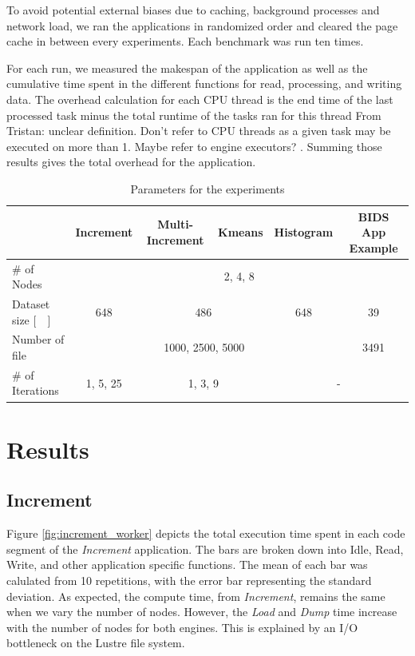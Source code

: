 \documentclass[conference]{IEEEtran}
\newcommand{\TG}[1]{\color{cyan}From Tristan: #1 \color{black}}
\begin{document}
To avoid potential external biases due to caching, background processes and
network load, we ran the applications in randomized order and cleared the
page cache in between every experiments. Each benchmark was run ten times.

For each run, we measured the makespan of the application as well as the
cumulative time spent in the different functions for read, processing, and
writing data. The overhead calculation for each CPU thread is the end time
of the last processed task minus the total runtime of the tasks ran for
this thread \TG{unclear definition. Don't refer to CPU threads as a given task may be executed on more than 1. Maybe refer to engine executors?}. Summing those results gives the total overhead for the
application.

\begin{table}[t]
	\renewcommand{\arraystretch}{1.5}
	\caption{Parameters for the experiments}\label{table:parameters}
	\centering
	\begin{tabular}{|l|c|c|c|c|c|}
		\hline & Increment & Multi-Increment & Kmeans & Histogram & BIDS App Example \\\hline
		\# of Nodes & \multicolumn{5}{c|}{2, 4, 8} \\\hline
		Dataset size [\SI{}{\giga\byte}] & 648 &\multicolumn{2}{c|}{486} & 648 & \multicolumn{1}{c|}{39} \\\hline
		Number of file & \multicolumn{4}{c|}{1000, 2500, 5000}  & \multicolumn{1}{c|}{3491} \\\hline
		\# of Iterations & 1, 5, 25 & \multicolumn{2}{c|}{1, 3, 9}                 & \multicolumn{2}{c|}{-} \\\hline
	\end{tabular}
\end{table}

\section{Results}
\subsection{Increment}
Figure \ref{fig:increment_worker} depicts the total execution time spent in each code segment of the \textit{Increment} application.
The bars are broken down into Idle, Read, Write, and other application specific functions.
The mean of each bar was calulated from 10 repetitions, with the error bar representing the standard deviation.
As expected, the compute time, from \textit{Increment}, remains the same when we vary the number of nodes.
However, the \textit{Load} and \textit{Dump} time increase with the number of nodes for both engines.
This is explained by an I/O bottleneck on the Lustre file system.
\end{document}

